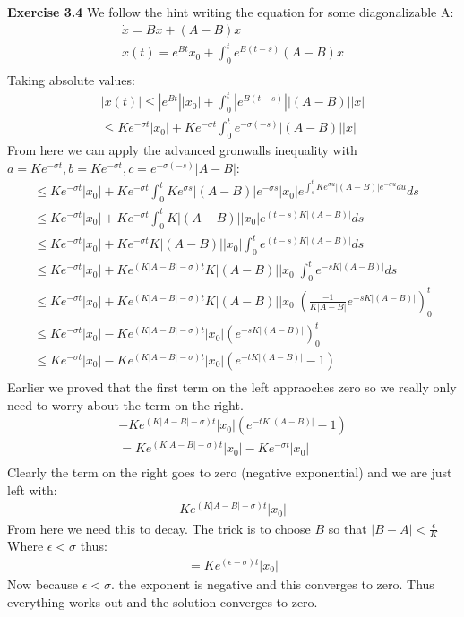 \documentclass[12pt]{article}
\newenvironment{exercise}[1]{\vspace{.1in}\noindent\textbf{Exercise #1 \hspace{.05em}}}{}
\theoremstyle{definition}
\theoremstyle{remark}
\begin{document}
\begin{exercise}{3.4}
	We follow the hint writing the equation for some diagonalizable A:
	\begin{align}
		\dot x = Bx+(A-B)x                      \\
		x(t)=e^{Bt}x_0+\int_0^te^{B(t-s)}(A-B)x \\
	\end{align}
	Taking absolute values:
	\begin{align}
		|x(t)|\leq |e^{Bt}||x_0|+ \int_0^t |e^{B(t-s)}||(A-B)||x| \\
		\leq Ke^{-\sigma t}|x_0|+ Ke^{-\sigma t}\int_0^t e^{-\sigma (-s)}|(A-B)||x|
	\end{align}
	From here we can apply the advanced gronwalls inequality with $a=Ke^{-\sigma t},b=Ke^{-\sigma t}, c=e^{-\sigma (-s)}|A-B|$:
	\begin{align}
		\leq  Ke^{-\sigma t}|x_0|+ Ke^{-\sigma t}\int_0^t Ke^{\sigma s}|(A-B)|e^{-\sigma s}|x_0|e^{\int_s^tKe^{\sigma u}|(A-B)|e^{-\sigma u}du}ds \\
		\leq  Ke^{-\sigma t}|x_0|+ Ke^{-\sigma t}\int_0^t K|(A-B)||x_0|e^{(t-s)K|(A-B)|}ds                                                        \\
		\leq  Ke^{-\sigma t}|x_0|+ Ke^{-\sigma t} K|(A-B)||x_0|\int_0^t e^{(t-s)K|(A-B)|}ds                                                       \\
		\leq  Ke^{-\sigma t}|x_0|+ Ke^{(K|A-B|-\sigma) t} K|(A-B)||x_0|\int_0^t e^{-sK|(A-B)|}ds                                                  \\
		\leq  Ke^{-\sigma t}|x_0|+ Ke^{(K|A-B|-\sigma) t} K|(A-B)||x_0|(\frac{-1}{K|A-B|} e^{-sK|(A-B)|})_0^{t}                                   \\
		\leq  Ke^{-\sigma t}|x_0|- Ke^{(K|A-B|-\sigma) t} |x_0|(e^{-sK|(A-B)|})_0^{t}                                                             \\
		\leq  Ke^{-\sigma t}|x_0|- Ke^{(K|A-B|-\sigma) t} |x_0|(e^{-tK|(A-B)|}-1)                                                                 \\
	\end{align}
	Earlier we proved that the first term on the left appraoches zero so we really only need to worry about the term on the right.
	\begin{align}
		- Ke^{(K|A-B|-\sigma) t} |x_0|(e^{-tK|(A-B)|}-1)   \\
		= Ke^{(K|A-B|-\sigma) t} |x_0|-Ke^{-\sigma t}|x_0| \\
	\end{align}
	Clearly the term on the right goes to zero (negative exponential) and we are just left with:
	\begin{align}
		Ke^{(K|A-B|-\sigma) t} |x_0|
	\end{align}
	From here we need this to decay. The trick is to choose $B$ so that $|B-A|<\frac{\epsilon}{K}$ Where $\epsilon < \sigma$ thus:
	\begin{align}
		=Ke^{(\epsilon-\sigma)t}|x_0|
	\end{align}
	Now because $\epsilon < \sigma$. the exponent is negative and this converges to zero. Thus everything works out and the solution converges to zero.


\end{exercise}
\end{document}
